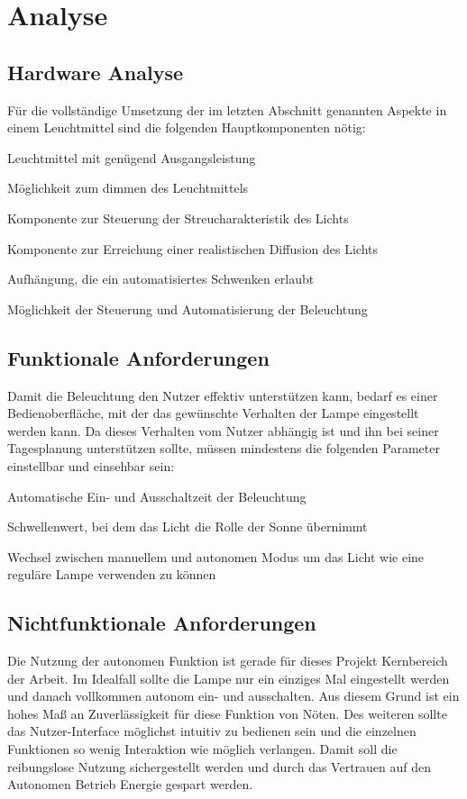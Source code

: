 \chapter{Analyse}

\section{Hardware Analyse}

Für die vollständige Umsetzung der im letzten Abschnitt genannten Aspekte in einem Leuchtmittel sind die folgenden Hauptkomponenten nötig:

\begin{compactitem}
	\item Leuchtmittel mit genügend Ausgangsleistung
	\item Möglichkeit zum dimmen des Leuchtmittels
	\item Komponente zur Steuerung der Streucharakteristik des Lichts
	\item Komponente zur Erreichung einer realistischen Diffusion des Lichts
	\item Aufhängung, die ein automatisiertes Schwenken erlaubt
	\item Möglichkeit der Steuerung und Automatisierung der Beleuchtung
\end{compactitem}


\section{Funktionale Anforderungen}
Damit die Beleuchtung den Nutzer effektiv unterstützen kann, bedarf es einer Bedienoberfläche, mit der das gewünschte Verhalten der Lampe eingestellt werden kann. Da dieses Verhalten vom Nutzer abhängig ist und ihn bei seiner Tagesplanung unterstützen sollte, müssen mindestens die folgenden Parameter einstellbar und einsehbar sein:

\begin{compactitem}
	\item Automatische Ein- und Ausschaltzeit der Beleuchtung
	\item Schwellenwert, bei dem das Licht die Rolle der Sonne übernimmt
	\item Wechsel zwischen manuellem und autonomen Modus um das Licht wie eine reguläre Lampe verwenden zu können
\end{compactitem}

\section{Nichtfunktionale Anforderungen}
Die Nutzung der autonomen Funktion ist gerade für dieses Projekt Kernbereich der Arbeit. Im Idealfall sollte die Lampe nur ein einziges Mal eingestellt werden und danach vollkommen autonom ein- und ausschalten. Aus diesem Grund ist ein hohes Maß an Zuverlässigkeit für diese Funktion von Nöten. Des weiteren sollte das Nutzer-Interface möglichst intuitiv zu bedienen sein und die einzelnen Funktionen so wenig Interaktion wie möglich verlangen. Damit soll die reibungslose Nutzung sichergestellt werden und durch das Vertrauen auf den Autonomen Betrieb Energie gespart werden.
